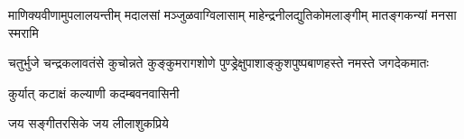 
\begin{center}
\begin{Large}
\fourlineindentedshloka
{माणिक्यवीणामुपलालयन्तीम्}
{मदालसां मञ्जुळवाग्विलासाम्}
{माहेन्द्रनीलद्युतिकोमलाङ्गीम्}
{मातङ्गकन्यां मनसा स्मरामि}

\twolineshloka
{चतुर्भुजे चन्द्रकलावतंसे कुचोन्नते कुङ्कुमरागशोणे}
{पुण्ड्रेक्षुपाशाङ्कुशपुष्पबाणहस्ते नमस्ते जगदेकमातः}

{कुर्यात् कटाक्षं कल्याणी कदम्बवनवासिनी}

{जय सङ्गीतरसिके जय लीलाशुकप्रिये}
\end{Large}
\end{center}
\pagebreak[4]
